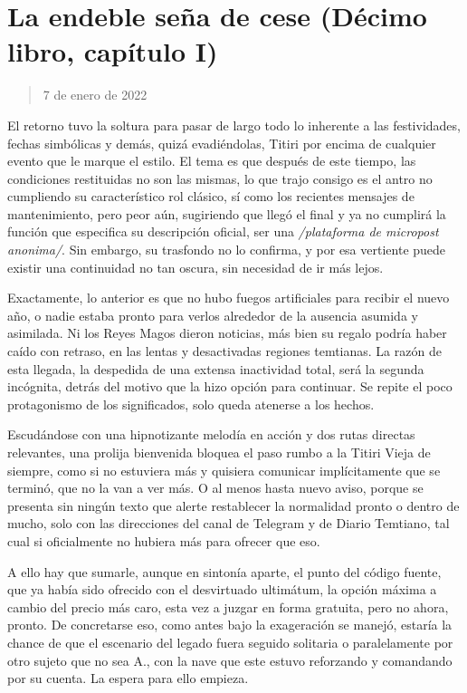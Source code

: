 \documentclass[
]{book}
\begin{document}
\hypertarget{la-endeble-seuxf1a-de-cese-duxe9cimo-libro-capuxedtulo-i}{%
\section{La endeble seña de cese (Décimo libro, capítulo I)}\label{la-endeble-seuxf1a-de-cese-duxe9cimo-libro-capuxedtulo-i}}

\begin{quote}
7 de enero de 2022
\end{quote}

El retorno tuvo la soltura para pasar de largo todo lo inherente a las festividades, fechas simbólicas y demás, quizá evadiéndolas, Titiri por encima de cualquier evento que le marque el estilo. El tema es que después de este tiempo, las condiciones restituidas no son las mismas, lo que trajo consigo es el antro no cumpliendo su característico rol clásico, sí como los recientes mensajes de mantenimiento, pero peor aún, sugiriendo que llegó el final y ya no cumplirá la función que especifica su descripción oficial, ser una \emph{/plataforma de micropost anonima/}. Sin embargo, su trasfondo no lo confirma, y por esa vertiente puede existir una continuidad no tan oscura, sin necesidad de ir más lejos.

Exactamente, lo anterior es que no hubo fuegos artificiales para recibir el nuevo año, o nadie estaba pronto para verlos alrededor de la ausencia asumida y asimilada. Ni los Reyes Magos dieron noticias, más bien su regalo podría haber caído con retraso, en las lentas y desactivadas regiones temtianas. La razón de esta llegada, la despedida de una extensa inactividad total, será la segunda incógnita, detrás del motivo que la hizo opción para continuar. Se repite el poco protagonismo de los significados, solo queda atenerse a los hechos.

Escudándose con una hipnotizante melodía en acción y dos rutas directas relevantes, una prolija bienvenida bloquea el paso rumbo a la Titiri Vieja de siempre, como si no estuviera más y quisiera comunicar implícitamente que se terminó, que no la van a ver más. O al menos hasta nuevo aviso, porque se presenta sin ningún texto que alerte restablecer la normalidad pronto o dentro de mucho, solo con las direcciones del canal de Telegram y de Diario Temtiano, tal cual si oficialmente no hubiera más para ofrecer que eso.

A ello hay que sumarle, aunque en sintonía aparte, el punto del código fuente, que ya había sido ofrecido con el desvirtuado ultimátum, la opción máxima a cambio del precio más caro, esta vez a juzgar en forma gratuita, pero no ahora, pronto. De concretarse eso, como antes bajo la exageración se manejó, estaría la chance de que el escenario del legado fuera seguido solitaria o paralelamente por otro sujeto que no sea A., con la nave que este estuvo reforzando y comandando por su cuenta. La espera para ello empieza.
\end{document}
